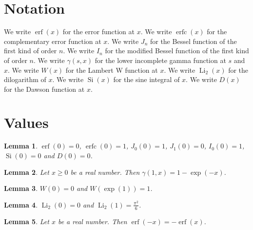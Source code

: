 \documentclass{article}
\newtheorem{lemma}{Lemma}
\begin{document}
\section{Notation}

We write $\operatorname{erf}(x)$ for the error function at $x$.
We write $\operatorname{erfc}(x)$ for the complementary error function at $x$.
We write $J_n$ for the Bessel function of the first kind of order $n$.
We write $I_n$ for the modified Bessel function of the first kind of order $n$.
We write $\gamma(s,x)$ for the lower incomplete gamma function at $s$ and $x$.
We write $W(x)$ for the Lambert W function at $x$.
We write $\operatorname{Li}_2(x)$ for the dilogarithm of $x$.
We write $\operatorname{Si}(x)$ for the sine integral of $x$.
We write $D(x)$ for the Dawson function at $x$.

\section{Values}

\begin{lemma}\label{zero}
$\operatorname{erf}(0)=0$, $\operatorname{erfc}(0)=1$, $J_0(0)=1$, $J_1(0)=0$, $I_0(0)=1$, $\operatorname{Si}(0)=0$ and $D(0)=0$.
\end{lemma}

\begin{lemma}\label{gamma}
Let $x\ge0$ be a real number. Then $\gamma(1,x)=1-\exp(-x)$.
\end{lemma}

\begin{lemma}\label{lambert}
$W(0)=0$ and $W(\exp(1))=1$.
\end{lemma}

\begin{lemma}\label{dilogarithm}
$\operatorname{Li}_2(0)=0$ and $\operatorname{Li}_2(1)=\frac{\pi^2}{6}$.
\end{lemma}

\begin{lemma}\label{odd}
Let $x$ be a real number. Then $\operatorname{erf}(-x)=-\operatorname{erf}(x)$.
\end{lemma}
\end{document}
